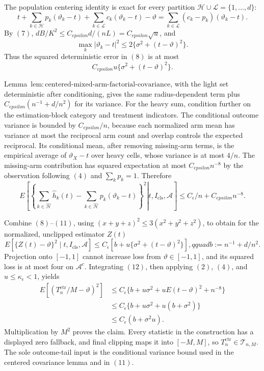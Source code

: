 The population centering identity is exact for every partition \(\mathcal H\cup\mathcal L=\{1,\ldots,d\}\):
\[
 t+\sum_{k\in\mathcal H}p_k(\vartheta_k-t)
 +\sum_{k\in\mathcal L}c_k(\vartheta_k-t)-\vartheta
 =\sum_{k\in\mathcal L}(c_k-p_k)(\vartheta_k-t).
\tag{8}
\]
By \((7)\), \(dB/K^2\le C_{epsilon}d/(nL)=C_{epsilon}\sqrt u\), and
\[
 \max_k|\vartheta_k-t|^2
 \le2\{\sigma^2+(t-\vartheta)^2\}.
\tag{9}
\]
Thus the squared deterministic error in \((8)\) is at most
\[
 C_{epsilon}u\{\sigma^2+(t-\vartheta)^2\}.
\tag{10}
\]

Lemma~\(\mathrm{lem:centered\text{-}mixed\text{-}arm\text{-}factorial\text{-}covariance}\), with the light set deterministic after conditioning, gives the same radius-dependent term plus \(C_{epsilon}(n^{-1}+d/n^2)\) for its variance.  For the heavy sum, condition further on the estimation-block category and treatment indicators.  The conditional outcome variance is bounded by \(C_{epsilon}/n\), because each normalized arm mean has variance at most the reciprocal arm count and overlap controls the expected reciprocal.  Its conditional mean, after removing missing-arm terms, is the empirical average of \(\vartheta_X-t\) over heavy cells, whose variance is at most \(4/n\).  The missing-arm contribution has squared expectation at most \(C_{epsilon}n^{-8}\) by the observation following \((4)\) and \(\sum_kp_k=1\).  Therefore
\[
 E\left[\left.
 \left\{
 \sum_{k\in\widehat{\mathcal H}}\widehat h_k(t)
 -\sum_{k\in\widehat{\mathcal H}}p_k(\vartheta_k-t)
 \right\}^2\right|t,I_{\mathrm{cls}},\mathcal A\right]
 \le C_{\epsilon}/n+C_{epsilon}n^{-8}.
\tag{11}
\]

Combine \((8)\)--\((11)\), using \((x+y+z)^2\le3(x^2+y^2+z^2)\), to obtain for the normalized, unclipped estimator \(Z(t)\)
\[
 E[\{Z(t)-\vartheta\}^2\mid t,I_{\mathrm{cls}},\mathcal A]
 \le C_{\epsilon}\left[
 b+u\{\sigma^2+(t-\vartheta)^2\}
 \right],qquad b:=n^{-1}+d/n^2.
\tag{12}
\]
Projection onto \([-1,1]\) cannot increase loss from \(\vartheta\in[-1,1]\), and its squared loss is at most four on \(\mathcal A^c\).  Integrating \((12)\), then applying \((2)\), \((4)\), and \(u\le\kappa_{\epsilon}<1\), yields
\[
\begin{aligned}
 E[(T_n^{\mathrm{ctr}}/M-\vartheta)^2]
 &\le C_{\epsilon}\{b+u\sigma^2+uE(t-\vartheta)^2+n^{-8}\}\\
 &\le C_{\epsilon}\{b+u\sigma^2+u(b+\sigma^2)\}\\
 &\le C_{\epsilon}(b+\sigma^2u).
\end{aligned}
\tag{13}
\]
Multiplication by \(M^2\) proves the claim.  Every statistic in the construction has a displayed zero fallback, and final clipping maps it into \([-M,M]\), so \(T_n^{\mathrm{ctr}}\in\mathcal T_{n,M}\).  The sole outcome-tail input is the conditional variance bound used in the centered covariance lemma and in \((11)\).